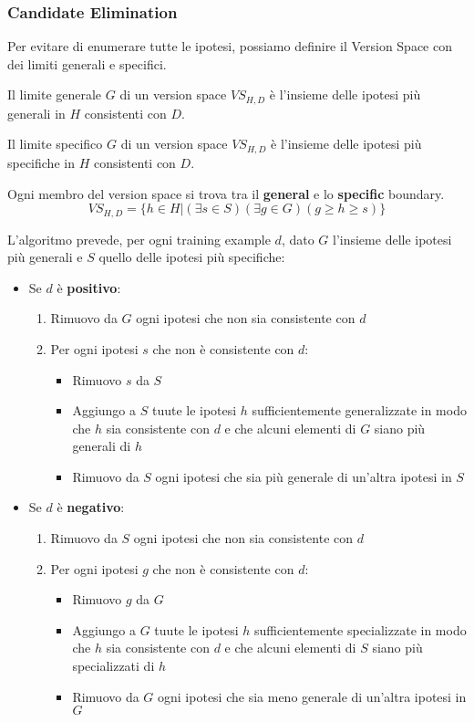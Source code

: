 \subsubsection{Candidate Elimination}
\label{alg:cand_elim}
Per evitare di enumerare tutte le ipotesi, possiamo definire il Version Space con dei limiti generali e specifici.
\begin{definition}
	Il limite generale $G$ di un version space $VS_{H,D}$ è l'insieme delle ipotesi più generali in $H$ consistenti con $D$.
\end{definition}
\begin{definition}
	Il limite specifico $G$ di un version space $VS_{H,D}$ è l'insieme delle ipotesi più specifiche in $H$ consistenti con $D$.
\end{definition}
\begin{theorem}
	Ogni membro del version space si trova tra il \textbf{general} e lo \textbf{specific} boundary.
	\begin{equation}
		VS_{H,D} = \{h \in H \vert (\exists s \in S) (\exists g \in G) (g\geq h \geq s)\}
	\end{equation}
\end{theorem}
L'algoritmo prevede, per ogni training example $d$, dato $G$ l'insieme delle ipotesi più generali e $S$ quello delle ipotesi più specifiche:
\begin{itemize}
	\item Se $d$ è \textbf{positivo}:
	\begin{enumerate}
		\item Rimuovo da $G$ ogni ipotesi che non sia consistente con $d$
		\item Per ogni ipotesi $s$ che non è consistente con $d$:
		\begin{itemize}
			\item Rimuovo $s$ da $S$
			\item Aggiungo a $S$ tuute le ipotesi $h$ sufficientemente generalizzate in modo che $h$ sia consistente con $d$ e che alcuni elementi di $G$ siano più generali di $h$
			\item Rimuovo da $S$ ogni ipotesi che sia più generale di un'altra ipotesi in $S$
		\end{itemize}
	\end{enumerate}
	\item Se $d$ è \textbf{negativo}:
	\begin{enumerate}
		\item Rimuovo da $S$ ogni ipotesi che non sia consistente con $d$
		\item Per ogni ipotesi $g$ che non è consistente con $d$:
		\begin{itemize}
			\item Rimuovo $g$ da $G$
			\item Aggiungo a $G$ tuute le ipotesi $h$ sufficientemente specializzate in modo che $h$ sia consistente con $d$ e che alcuni elementi di $S$ siano più specializzati di $h$
			\item Rimuovo da $G$ ogni ipotesi che sia meno generale di un'altra ipotesi in $G$
		\end{itemize}
	\end{enumerate}
\end{itemize}
